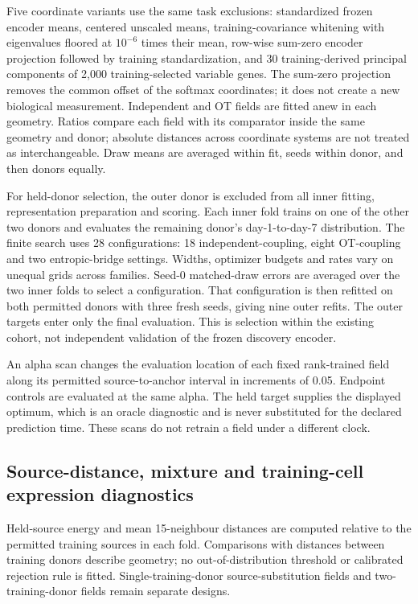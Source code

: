 \documentclass[10pt,a4paper]{article}
\begin{document}
Five coordinate variants use the same task exclusions: standardized frozen encoder means, centered unscaled means, training-covariance whitening with eigenvalues floored at $10^{-6}$ times their mean, row-wise sum-zero encoder projection followed by training standardization, and 30 training-derived principal components of 2,000 training-selected variable genes. The sum-zero projection removes the common offset of the softmax coordinates; it does not create a new biological measurement. Independent and OT fields are fitted anew in each geometry. Ratios compare each field with its comparator inside the same geometry and donor; absolute distances across coordinate systems are not treated as interchangeable. Draw means are averaged within fit, seeds within donor, and then donors equally.

For held-donor selection, the outer donor is excluded from all inner fitting, representation preparation and scoring. Each inner fold trains on one of the other two donors and evaluates the remaining donor's day-1-to-day-7 distribution. The finite search uses 28 configurations: 18 independent-coupling, eight OT-coupling and two entropic-bridge settings. Widths, optimizer budgets and rates vary on unequal grids across families. Seed-0 matched-draw errors are averaged over the two inner folds to select a configuration. That configuration is then refitted on both permitted donors with three fresh seeds, giving nine outer refits. The outer targets enter only the final evaluation. This is selection within the existing cohort, not independent validation of the frozen discovery encoder.

An alpha scan changes the evaluation location of each fixed rank-trained field along its permitted source-to-anchor interval in increments of 0.05. Endpoint controls are evaluated at the same alpha. The held target supplies the displayed optimum, which is an oracle diagnostic and is never substituted for the declared prediction time. These scans do not retrain a field under a different clock.

\subsection{Source-distance, mixture and training-cell expression diagnostics}
Held-source energy and mean 15-neighbour distances are computed relative to the permitted training sources in each fold. Comparisons with distances between training donors describe geometry; no out-of-distribution threshold or calibrated rejection rule is fitted. Single-training-donor source-substitution fields and two-training-donor fields remain separate designs.
\end{document}
